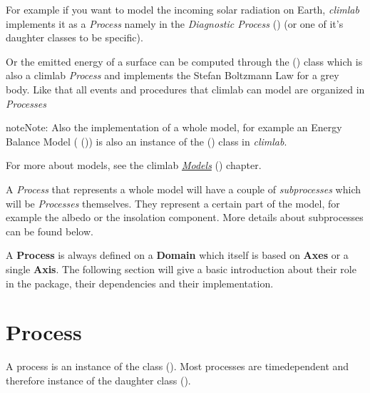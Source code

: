 \documentclass[a4paper,10pt,english]{sphinxmanual}
\begin{document}
For example if you want to model the incoming solar radiation on Earth, \emph{climlab} implements it as a \emph{Process} namely in the \emph{Diagnostic Process} {\hyperref[api/climlab.radiation:climlab.radiation.insolation._Insolation]{\emph{}}} () (or one of it's daughter classes to be specific).

Or the emitted energy of a surface can be computed through  the {\hyperref[api/climlab.radiation:climlab.radiation.Boltzmann.Boltzmann]{\emph{}}} () class which is also a climlab \emph{Process} and implements the Stefan Boltzmann Law for a grey body. Like that all events and procedures that climlab can model are organized in \emph{Processes}

\begin{notice}{note}{Note:}
Also the implementation of a whole model, for example an Energy Balance Model ({\hyperref[api/climlab.model:climlab.model.ebm.EBM]{\emph{}}} ()) is also an instance of the {\hyperref[api/climlab.process:climlab.process.process.Process]{\emph{}}} () class in \emph{climlab}.

For more about models, see the climlab {\hyperref[models:models]{\emph{Models}}} () chapter.
\end{notice}

A \emph{Process} that represents a whole model will have a couple of \emph{subprocesses} which will be \emph{Processes} themselves. They represent a certain part of the model, for example the albedo or the insolation component. More details about subprocesses can be found below.

A \textbf{Process} is always defined on a \textbf{Domain} which itself is based on \textbf{Axes} or a single \textbf{Axis}. The following section will give a basic introduction about their role in the package, their dependencies and their implementation.


\section{Process}
\label{architecture:process}\label{architecture:process-architecture}
A process is an instance of the class {\hyperref[api/climlab.process:climlab.process.process.Process]{\emph{}}} (). Most processes are timedependent and therefore instance of the daughter class {\hyperref[api/climlab.process:climlab.process.time_dependent_process.TimeDependentProcess]{\emph{}}} ().
\end{document}
